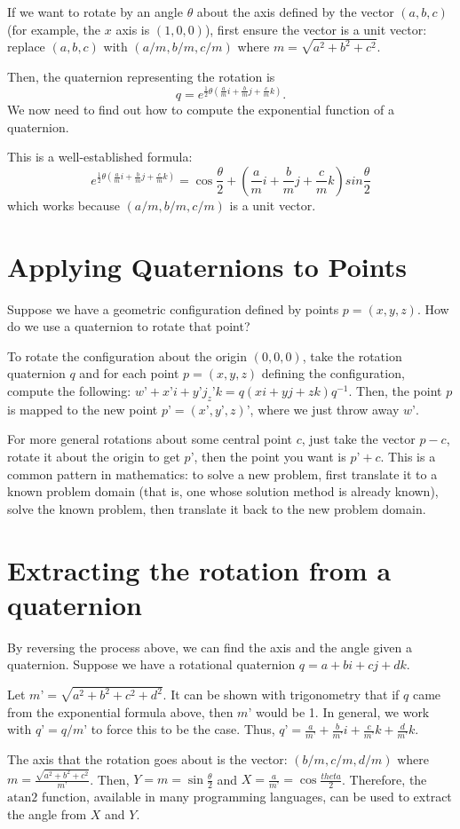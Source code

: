 \documentclass[letter,12pt]{article}
\begin{document}
If we want to rotate by an angle $\theta$ about the axis defined by the vector $(a,b,c)$ (for example, the $x$ axis is $(1,0,0)$), first ensure the vector is a unit vector: replace $(a,b,c)$ with $(a/m,b/m,c/m)$ where $m=\sqrt{a^2+b^2+c^2}$.

Then, the quaternion representing the rotation is 
\[q=e^{\frac12\theta(\frac{a}{m}i+\frac{b}{m}j+\frac{c}{m}k)}.\]
 We now need to find out how to compute the exponential function of a quaternion.

This is a well-established formula:
\[
e^{\frac12\theta(\frac{a}{m}i+\frac{b}{m}j+\frac{c}{m}k)}=\cos{\frac{\theta}2} + (\frac{a}{m}i+\frac{b}{m}j+\frac{c}{m}k)sin{\frac{\theta}2}
\]
which works because $(a/m,b/m,c/m)$ is a unit vector.

\section{Applying Quaternions to Points}
Suppose we have a geometric configuration defined by points $p=(x,y,z)$. How do we use a quaternion to rotate that point?

To rotate the configuration about the origin $(0,0,0)$, take the rotation quaternion $q$ and for each point $p=(x,y,z)$ defining the configuration, compute the following: $w’+x’i+y’j_z’k = q(xi+yj+zk)q^{-1}$.  Then, the point $p$ is mapped to the new point $p’=(x’,y’,z)’$, where we just throw away $w’$.

For more general rotations about some central point $c$, just take the vector $p-c$, rotate it about the origin to get $p’$, then the point you want is $p’+c$.  This is a common pattern in mathematics: to solve a new problem, first translate it to a known problem domain (that is, one whose solution method is already known), solve the known problem, then translate it back to the new problem domain.

\section{Extracting the rotation from a quaternion}
By reversing the process above, we can find the axis and the angle given a quaternion.  Suppose we have a rotational quaternion $q=a+bi+cj+dk$.  

Let $m’=\sqrt{a^2+b^2+c^2+d^2}$.  It can be shown with trigonometry that  if $q$ came from the exponential formula above, then $m’$ would be 1.  In general, we work  with $q’=q/m’$ to force this to be the case.  Thus, 
$q’=\frac{a}{m’}+\frac{b}{m’}i+\frac{c}{m’}k+\frac{d}{m’}k$.

The axis that the rotation goes about is the vector:
$(b/m, c/m, d/m)$ where $m=\frac{\sqrt{a^2+b^2+c^2}}{m’}$.
Then, $Y=m=\sin\frac{\theta}{2}$ and $X=\frac{a}{m’}=\cos\frac{theta}{2}$.  Therefore, the $\mathrm{atan2}$ function, available in many programming languages, can be used to extract the angle from $X$ and $Y$.
\end{document}
